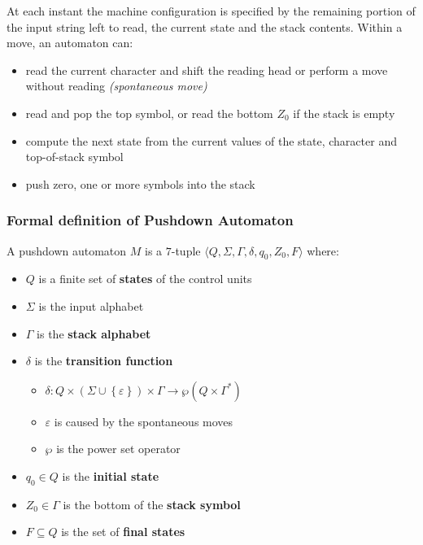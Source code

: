 \documentclass[english]{article}
\begin{document}
At each instant the machine configuration is specified by the remaining portion of the input string left to read, the current state and the stack contents.
Within a move, an automaton can:

\begin{itemize}
  \item read the current character and shift the reading head or perform a move without reading \textit{(spontaneous move)}
  \item read and pop the top symbol, or read the bottom \(Z_0\) if the stack is empty
  \item compute the next state from the current values of the state, character and top-of-stack symbol
  \item push zero, one or more symbols into the stack
\end{itemize}

\subsubsection{Formal definition of Pushdown Automaton}
\label{sec:formal-definition-pda}

A pushdown automaton \(M\) is a \(7\)-tuple \(\langle Q, \Sigma, \Gamma, \delta, q_0, Z_0, F \rangle\) where:

\begin{itemize}
  \item \(Q\) is a finite set of \textbf{states} of the control units
  \item \(\Sigma\) is the input alphabet
  \item \(\Gamma\) is the \textbf{stack alphabet}
  \item \(\delta\) is the \textbf{transition function}
        \begin{itemize}
          \item \(\delta: Q \times \left( \Sigma \cup \left\{ \varepsilon \right\} \right) \times \Gamma \rightarrow \wp \left( Q \times \Gamma^\ast \right)\)
          \item \(\varepsilon\) is caused by the spontaneous moves
          \item \(\wp\) is the power set operator
        \end{itemize}
  \item \(q_0 \in Q\) is the \textbf{initial state}
  \item \(Z_0 \in \Gamma\) is the bottom of the \textbf{stack symbol}
  \item \(F \subseteq Q\) is the set of \textbf{final states}
\end{itemize}
\end{document}
